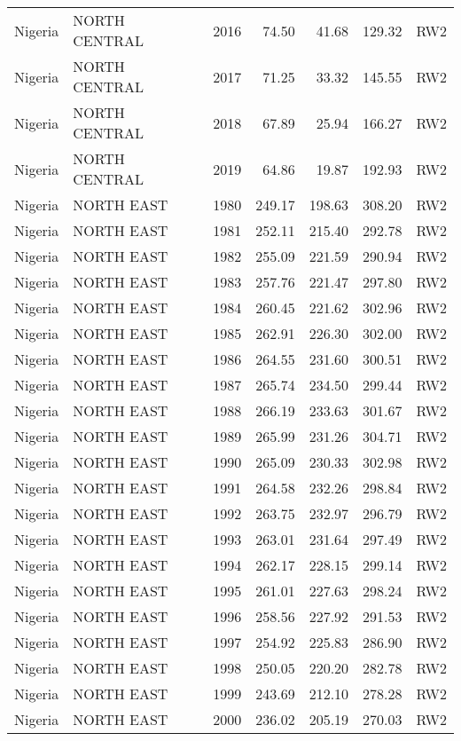 \begin{longtable}{lllrrrl}
  Nigeria & NORTH CENTRAL & 2016 & 74.50 & 41.68 & 129.32 & RW2 \\ 
  Nigeria & NORTH CENTRAL & 2017 & 71.25 & 33.32 & 145.55 & RW2 \\ 
  Nigeria & NORTH CENTRAL & 2018 & 67.89 & 25.94 & 166.27 & RW2 \\ 
  Nigeria & NORTH CENTRAL & 2019 & 64.86 & 19.87 & 192.93 & RW2 \\ 
  Nigeria & NORTH EAST & 1980 & 249.17 & 198.63 & 308.20 & RW2 \\ 
  Nigeria & NORTH EAST & 1981 & 252.11 & 215.40 & 292.78 & RW2 \\ 
  Nigeria & NORTH EAST & 1982 & 255.09 & 221.59 & 290.94 & RW2 \\ 
  Nigeria & NORTH EAST & 1983 & 257.76 & 221.47 & 297.80 & RW2 \\ 
  Nigeria & NORTH EAST & 1984 & 260.45 & 221.62 & 302.96 & RW2 \\ 
  Nigeria & NORTH EAST & 1985 & 262.91 & 226.30 & 302.00 & RW2 \\ 
  Nigeria & NORTH EAST & 1986 & 264.55 & 231.60 & 300.51 & RW2 \\ 
  Nigeria & NORTH EAST & 1987 & 265.74 & 234.50 & 299.44 & RW2 \\ 
  Nigeria & NORTH EAST & 1988 & 266.19 & 233.63 & 301.67 & RW2 \\ 
  Nigeria & NORTH EAST & 1989 & 265.99 & 231.26 & 304.71 & RW2 \\ 
  Nigeria & NORTH EAST & 1990 & 265.09 & 230.33 & 302.98 & RW2 \\ 
  Nigeria & NORTH EAST & 1991 & 264.58 & 232.26 & 298.84 & RW2 \\ 
  Nigeria & NORTH EAST & 1992 & 263.75 & 232.97 & 296.79 & RW2 \\ 
  Nigeria & NORTH EAST & 1993 & 263.01 & 231.64 & 297.49 & RW2 \\ 
  Nigeria & NORTH EAST & 1994 & 262.17 & 228.15 & 299.14 & RW2 \\ 
  Nigeria & NORTH EAST & 1995 & 261.01 & 227.63 & 298.24 & RW2 \\ 
  Nigeria & NORTH EAST & 1996 & 258.56 & 227.92 & 291.53 & RW2 \\ 
  Nigeria & NORTH EAST & 1997 & 254.92 & 225.83 & 286.90 & RW2 \\ 
  Nigeria & NORTH EAST & 1998 & 250.05 & 220.20 & 282.78 & RW2 \\ 
  Nigeria & NORTH EAST & 1999 & 243.69 & 212.10 & 278.28 & RW2 \\ 
  Nigeria & NORTH EAST & 2000 & 236.02 & 205.19 & 270.03 & RW2 \\ 

\end{longtable}
